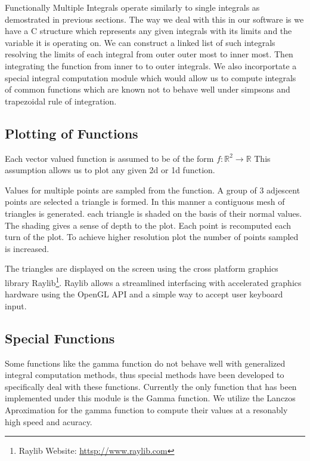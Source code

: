 \documentclass[12pt]{article}
\begin{document}
Functionally Multiple Integrals operate similarly to single integrals as demostrated in previous sections. The way we deal with this in our software is
we have a C structure which represents any given integrals with its limits and the variable it is operating on. We can construct a linked list of such integrals
resolving the limits of each integral from outer outer most to inner most. Then integrating the function from inner to to outer integrals. We also incorportate
a special integral computation module which would allow us to compute integrals of common functions which are known not to behave well under simpsons and 
trapezoidal rule of integration.

\subsection{Plotting of Functions}

Each vector valued function is assumed to be of the form $f:\mathbb{R}^2 \rightarrow \mathbb{R}$ This assumption allows us to plot any given 2d or 1d function.

Values for multiple points are sampled from the function. A group of 3 adjescent points are selected a triangle is formed. In this manner a contiguous mesh of
triangles is generated. each triangle is shaded on the basis of their normal values. The shading gives a sense of depth to the plot. Each point is recomputed each
turn of the plot. To achieve higher resolution plot the number of points sampled is increased.

The triangles are displayed on the screen using the cross platform graphics library Raylib\footnote{Raylib Website: \url{httsp://www.raylib.com}}. Raylib allows a streamlined interfacing with accelerated graphics
hardware using the OpenGL API and a simple way to accept user keyboard input.

\subsection{Special Functions}

Some functions like the gamma function do not behave well with generalized integral computation methods, thus special
methods have been developed to specifically deal with these functions. Currently the only function that has been implemented
under this module is the Gamma function. We utilize the Lanczos Aproximation\cite{aa} for the gamma function to compute their values at 
a resonably high speed and acuracy.
\end{document}
